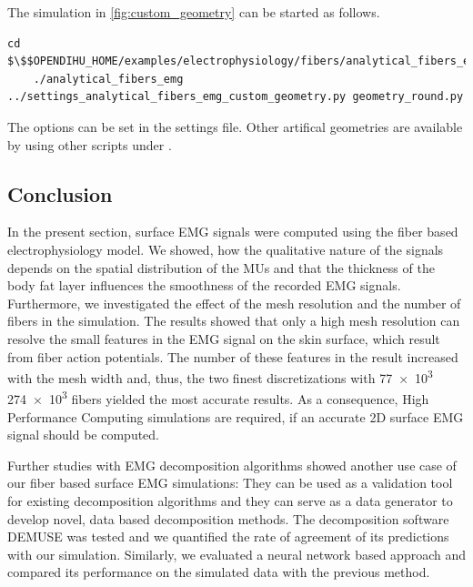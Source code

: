 \begin{reproduce_no_break}
  The simulation in \cref{fig:custom_geometry} can be started as follows.
  \begin{lstlisting}[columns=fullflexible,breaklines=true,postbreak=\mbox{\textcolor{gray}{$\hookrightarrow$}\space}]
    cd $\$$OPENDIHU_HOME/examples/electrophysiology/fibers/analytical_fibers_emg/build_release
    ./analytical_fibers_emg ../settings_analytical_fibers_emg_custom_geometry.py geometry_round.py
  \end{lstlisting}
  The options can be set in the  settings file. Other artifical geometries are available by using other scripts under .
\end{reproduce_no_break}

\subsection{Conclusion}

In the present section, surface EMG signals were computed using the fiber based electrophysiology model. We showed, how the qualitative nature of the signals depends on the spatial distribution of the MUs and that the thickness of the body fat layer influences the smoothness of the recorded EMG signals. Furthermore, we investigated the effect of the mesh resolution and the number of fibers in the simulation. The results showed that only a high mesh resolution can resolve the small features in the EMG signal  on the skin surface, which result from fiber action potentials. The number of these features in the result increased with the mesh width and, thus, the two finest discretizations with \num{77e3} \num{274e3} fibers yielded the most accurate results. As a consequence, High Performance Computing simulations are required, if an accurate 2D surface EMG signal should be computed.

Further studies with EMG decomposition algorithms showed another use case of our fiber based surface EMG simulations: They can be used as a validation tool for existing decomposition algorithms and they can serve as a data generator to develop novel, data based decomposition methods. The decomposition software DEMUSE was tested and we quantified the rate of agreement of its predictions with our simulation. Similarly, we evaluated a neural network based approach and compared its performance on the simulated data with the previous method.

